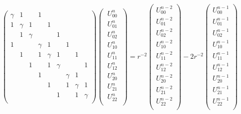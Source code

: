 \documentclass[legalpaper, 12pt]{article}
\begin{document}
\begin{eqnarray}
\begin{pmatrix}
\gamma   &    1    &         &    1    &         &         &         &         &         \\ 
    1    & \gamma  &     1   &         &     1   &         &         &         &         \\ 
         &    1    & \gamma  &         &         &    1    &         &         &         \\ 
    1    &         &         & \gamma  &    1    &         &    1    &         &         \\ 
         &    1    &         &    1    & \gamma  &    1    &         &    1    &         \\ 
         &         &    1    &         &    1    & \gamma  &         &         &    1    \\ 
         &         &         &    1    &         &         & \gamma  &    1    &         \\ 
         &         &         &         &    1    &         &    1    & \gamma  &    1    \\ 
         &         &         &         &         &    1    &         &    1    & \gamma  \\
\end{pmatrix} 
\begin{pmatrix}
 \ U_{00}^n \ \\
 \ U_{01}^n \ \\ 
 \ U_{02}^n \ \\ 
 \ U_{10}^n \ \\ 
 \ U_{11}^n \ \\ 
 \ U_{12}^n \ \\ 
 \ U_{20}^n \ \\ 
 \ U_{21}^n \ \\ 
 \ U_{22}^n \ \\ 
\end{pmatrix}
=
r^{-2} 
\begin{pmatrix}
U_{00}^{n-2} \\
U_{01}^{n-2} \\ 
U_{02}^{n-2} \\ 
U_{10}^{n-2} \\ 
U_{11}^{n-2} \\ 
U_{12}^{n-2} \\ 
U_{20}^{n-2} \\ 
U_{21}^{n-2} \\ 
U_{22}^{n-2} \\
\end{pmatrix}
-2r^{-2} 
\begin{pmatrix}
U_{00}^{n-1} \\
U_{01}^{n-1} \\ 
U_{02}^{n-1} \\ 
U_{10}^{n-1} \\ 
U_{11}^{n-1} \\ 
U_{12}^{n-1} \\ 
U_{20}^{n-1} \\ 
U_{21}^{n-1} \\ 
U_{22}^{n-1} \\
\end{pmatrix}
\end{eqnarray}
\end{document}
